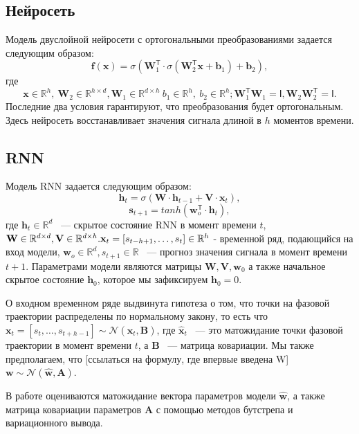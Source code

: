 \documentclass[12pt, twoside]{article}
\begin{document}
\subsection{Нейросеть}
Модель двуслойной нейросети с ортогональными преобразованиями задается следующим образом: \[\mathbf{f}(\mathbf{x}) = \sigma(\mathbf{W}_1^{\mathsf{T}}\cdot \sigma(\mathbf{W}_2^{\mathsf{T}}\mathbf{x} + \mathbf{b}_1) + \mathbf{b}_2),\] где  \[\mathbf{x} \in \mathbb{R}^{h}, \ \mathbf{W}_2 \in \mathbb{R}^{h \times d}, \mathbf{W}_1 \in \mathbb{R}^{d \times h} \ b_1 \in \mathbb{R}^h, \ b_2 \in \mathbb{R}^{h}; \mathbf{W}_1^{\mathsf{T}}\mathbf{W}_1=\mathsf{I}, \mathbf{W}_2\mathbf{W}_2^{\mathsf{T}}=\mathsf{I}.\] Последние два условия гарантируют, что преобразования будет ортогональным. Здесь нейросеть восстанавливает значения сигнала длиной в $h$ моментов времени.

\subsection{RNN}
Модель RNN задается следующим образом: \[ \mathbf{h}_t = \sigma(\mathbf{W} \cdot \mathbf{h}_{t-1} + \mathbf{V} \cdot \mathbf{x}_t),\]
\[ \mathbf{s}_{t+1} = tanh(\mathbf{w}_o^{\mathsf{T}} \cdot \mathbf{h}_t), \] где $\mathbf{h}_{t} \in \mathbb{R}^{d}$ ~--- скрытое состояние RNN в момент времени $t$, $\mathbf{W} \in \mathbb{R}^{d \times d}, \mathbf{V} \in \mathbb{R}^{d \times h}. \\
\mathbf{x}_t = [s_{t - h + 1}, \dots, s_{t}] \in \mathbb{R}^h$ - временной ряд, подающийся на вход модели, $\mathbf{w}_o \in \mathbb{R}^{d}, s_{t+1} \in \mathbb{R}$ ~--- прогноз значения сигнала в момент времени $t+1$. Параметрами модели являются матрицы $\mathbf{W}, \mathbf{V}, \mathbf{w}_0$ а также начальное скрытое состояние $\mathbf{h}_0$, которое мы зафиксируем $\mathbf{h}_0=0$.

О входном временном ряде выдвинута гипотеза о том, что точки на фазовой траектории распределены по нормальному закону, то есть что $\mathbf{x}_t = [s_t, \dots, s_{t + h - 1}] \sim \mathcal{N}(\hat{\mathbf{x}}_t, \mathbf{B})$, где $\hat{\mathbf{x}}_t$ ~--- это матожидание точки фазовой траектории в момент времени $t$, а $\mathbf{B}$ ~--- матрица ковариации. Мы также предполагаем, что [ссылаться на формулу, где впервые введена W]$\mathbf{w} \sim \mathcal{N}(\hat{\mathbf{w}}, \mathbf{A})$. 

В работе оцениваются матожидание вектора параметров модели $\hat{\mathbf{w}}$, а также матрица ковариации параметров $\mathbf{A}$ с помощью методов бутстрепа и вариационного вывода.
\end{document}
